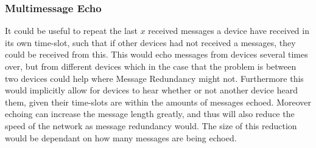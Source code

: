 \subsubsection*{Multimessage Echo}
It could be useful to repeat the last $x$ received messages a device have received in its own time-slot, such that if other devices had not received a messages, they could be received from this.
This would echo messages from devices several times over, but from different devices which in the case that the problem is between two devices could help where Message Redundancy might not.  
Furthermore this would implicitly allow for devices to hear whether or not another device heard them, given their time-slots are within the amounts of messages echoed.
Moreover echoing can increase the message length greatly, and thus will also reduce the speed of the network as message redundancy would.
The size of this reduction would be dependant on how many messages are being echoed. 
